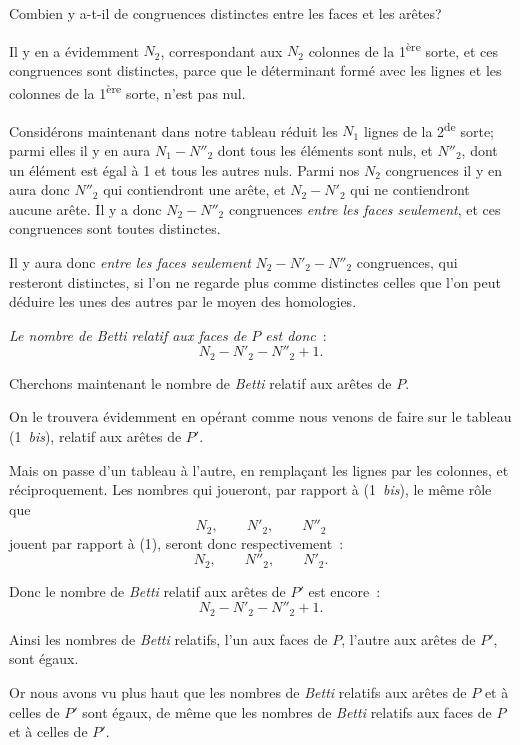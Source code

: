 \documentclass{article}
\begin{document}
Combien y a-t-il de congruences distinctes entre les faces et les arêtes?

Il y en a évidemment $N_{2}$, correspondant aux $N_{2}$ colonnes de la
1\textsuperscript{ère} sorte, et ces congruences sont distinctes, parce que le déterminant formé avec les lignes et les colonnes de la 1\textsuperscript{ère} sorte, n'est pas nul.

Considérons maintenant dans notre tableau réduit les $N_{1}$ lignes de la 2\textsuperscript{de} sorte; parmi elles il y en aura $N_{1} - N''_{2}$ dont tous les éléments sont nuls, et $N''_{2}$, dont un élément est égal à 1 et tous les autres nuls. Parmi nos $N_{2}$ congruences il y en aura donc $N''_{2}$ qui contiendront une arête, et $N_{2} - N'_{2}$ qui ne contiendront aucune arête. Il y a donc $N_{2} - N''_{2}$ congruences \emph{entre les faces seulement}, et ces congruences sont toutes distinctes.

Il y aura donc \emph{entre les faces seulement} $N_{2} - N'_{2} - N''_{2}$ congruences, qui resteront distinctes, si l'on ne regarde plus comme distinctes celles que l'on peut déduire les unes des autres par le moyen des homologies.

\emph{Le nombre de Betti relatif aux faces de $P$ est donc}~:
\[ N_{2} - N'_{2} - N''_{2} + 1. \]

Cherchons maintenant le nombre de \emph{Betti} relatif aux arêtes de $P$.

On le trouvera évidemment en opérant comme nous venons de faire sur le tableau (1~\emph{bis}), relatif aux arêtes de $P'$.

Mais on passe d'un tableau à l'autre, en remplaçant les lignes par les colonnes, et réciproquement. Les nombres qui joueront, par rapport à (1~\emph{bis}), le même rôle que
\[ N_{2}, \qquad N'_{2}, \qquad N''_{2} \]
jouent par rapport à (1), seront donc respectivement~:
\[ N_{2}, \qquad N''_{2}, \qquad N'_{2}. \]

Donc le nombre de \emph{Betti} relatif aux arêtes de $P'$ est encore~:
\[ N_{2} - N'_{2} - N''_{2} + 1. \]

Ainsi les nombres de \emph{Betti} relatifs, l'un aux faces de $P$, l'autre aux arêtes de $P'$, sont égaux.


Or nous avons vu plus haut que les nombres de \emph{Betti} relatifs aux arêtes de $P$ et à celles de $P'$ sont égaux, de même que les nombres de \emph{Betti} relatifs aux faces de $P$ et à celles de $P'$.
\end{document}
